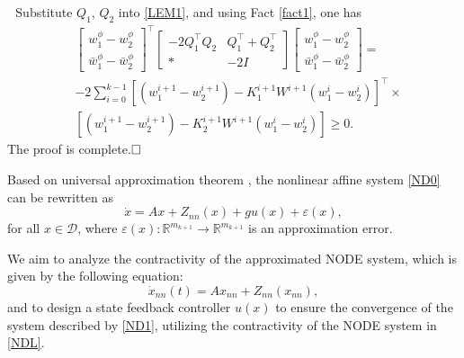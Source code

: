 \documentclass[journal,twoside,web]{ieeecolor}
\renewenvironment{proof}{\vspace{.1cm}\noindent{\sc Proof.}\hspace{0.10cm}\,\,}{$\hfill\Box$\vspace{.1cm}}
\begin{document}
\begin{proof}
Substitute $Q_1$, $Q_2$ into \eqref{LEM1}, and using Fact \ref{fact1}, one has
\begin{equation}\label{LEMP1}
 \begin{aligned}
&\begin{bmatrix}
w_1^{\phi}-w_2^{\phi}
 \\
\bar{w}_1^{\phi}-\bar{w}_2^{\phi}
\end{bmatrix}^\top \begin{bmatrix}
 -2Q_1^\top Q_2&Q_1^\top+Q_2^\top
 \\
\ast&-2I
\end{bmatrix}\begin{bmatrix}
w_1^{\phi}-w_2^{\phi}
 \\
\bar{w}_1^{\phi}-\bar{w}_2^{\phi}
\end{bmatrix}=\\&-2\sum_{i=0}^{k-1}[(w_1^{i+1}-w_2^{i+1})-K_1^{i+1}W^{i+1}(w_1^{i}-w_2^{i})]^\top\times\\&[(w_1^{i+1}-w_2^{i+1})-K_2^{i+1}W^{i+1}(w_1^{i}-w_2^{i})]\geq 0.
\end{aligned}
\end{equation}
The proof is complete.\end{proof}

Based on universal approximation theorem \cite{hornik1989multilayer}, the nonlinear affine system \eqref{ND0} can be rewritten as
 \begin{equation}\label{ND1}
\dot{x}=Ax+Z_{nn}(x)+gu(x)+\varepsilon(x), 
\end{equation}
for all $x\in \mathcal{D}$, where $\varepsilon(x):\mathbb{R}^{m_{k+1}}\rightarrow \mathbb{R}^{m_{k+1}}$ is an approximation error.



We aim to analyze the contractivity of the approximated NODE system, which is given by the following equation:
 \begin{equation}\label{NDL}
\dot{x}_{nn}(t)=Ax_{nn}+Z_{nn}(x_{nn}), 
\end{equation}
and to design a state feedback controller $u(x)$ to ensure the convergence of the system described by \eqref{ND1}, utilizing the contractivity of the NODE system in \eqref{NDL}.
\end{document}
